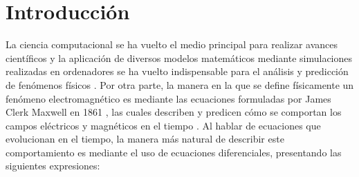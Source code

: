\documentclass[11pt,a4paper,twoside,pdf]{article}
\numberwithin{equation}{section}
\begin{document}
\tableofcontents

\newpage

\pagestyle{fancy}
\fancyhead[RO,LE]{\leftmark}
\fancyhead[LO,RE]{\thepage}
\fancyfoot{}

\section{Introducción}

La ciencia computacional se ha vuelto el medio principal para realizar avances científicos y la aplicación de diversos modelos matemáticos mediante simulaciones realizadas en ordenadores se ha vuelto indispensable para el análisis y predicción de fenómenos físicos \cite{computational}\cite{IEEComp}\cite{CompPhys}. Por otra parte, la manera en la que se define físicamente un fenómeno electromagnético es mediante las ecuaciones formuladas por James Clerk Maxwell en 1861 \cite{wikipedia}, las cuales describen y predicen cómo se comportan los campos eléctricos y magnéticos en el tiempo \cite{intromaxwell}. Al hablar de ecuaciones que evolucionan en el tiempo, la manera más natural de describir este comportamiento es mediante el uso de ecuaciones diferenciales, presentando las siguientes expresiones:
\end{document}
